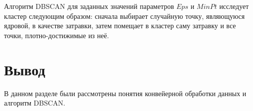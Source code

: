 Алгоритм DBSCAN для заданных значений параметров $Eps$ и $MinPt$ исследует кластер следующим образом: сначала выбирает случайную точку, являющуюся ядровой, в качестве затравки, затем помещает в кластер саму затравку и все точки, плотно-достижимые из неё.

\section*{Вывод}

В данном разделе были рассмотрены понятия конвейерной обработки данных и алгоритм DBSCAN.